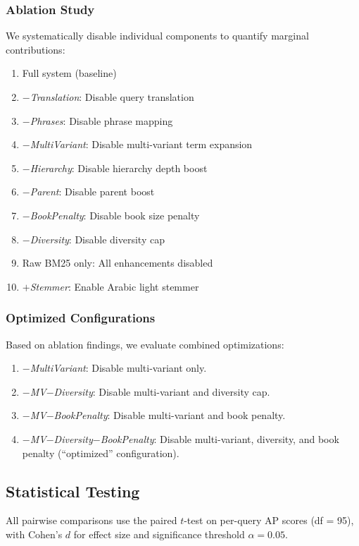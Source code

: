 \documentclass[preprint,12pt,numbers]{elsarticle}
\begin{document}
\subsubsection{Ablation Study}
We systematically disable individual components to quantify marginal contributions:
\begin{enumerate}
    \item Full system (baseline)
    \item \textit{$-$Translation}: Disable query translation
    \item \textit{$-$Phrases}: Disable phrase mapping
    \item \textit{$-$MultiVariant}: Disable multi-variant term expansion
    \item \textit{$-$Hierarchy}: Disable hierarchy depth boost
    \item \textit{$-$Parent}: Disable parent boost
    \item \textit{$-$BookPenalty}: Disable book size penalty
    \item \textit{$-$Diversity}: Disable diversity cap
    \item Raw BM25 only: All enhancements disabled
    \item \textit{$+$Stemmer}: Enable Arabic light stemmer
\end{enumerate}

\subsubsection{Optimized Configurations}
Based on ablation findings, we evaluate combined optimizations:
\begin{enumerate}
    \item \textit{$-$MultiVariant}: Disable multi-variant only.
    \item \textit{$-$MV$-$Diversity}: Disable multi-variant and diversity cap.
    \item \textit{$-$MV$-$BookPenalty}: Disable multi-variant and book penalty.
    \item \textit{$-$MV$-$Diversity$-$BookPenalty}: Disable multi-variant, diversity, and book penalty (``optimized'' configuration).
\end{enumerate}

\subsection{Statistical Testing}

All pairwise comparisons use the paired $t$-test on per-query AP scores (df = 95), with Cohen's $d$ for effect size and significance threshold $\alpha = 0.05$.
\end{document}
